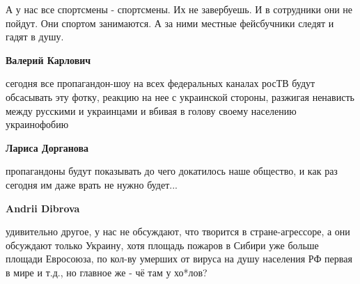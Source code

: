 \begin{itemize}
\begin{itemize}
 

А у нас все спортсмены - спортсмены. Их не завербуешь. И в сотрудники они не
пойдут. Они спортом занимаются. А за ними местные фейсбучники следят и гадят в
душу.


 
\textbf{Валерий Карлович} 

сегодня все пропагандон-шоу на всех федеральных каналах росТВ будут обсасывать
эту фотку, реакцию на нее с украинской стороны, разжигая ненависть между
русскими и украинцами и вбивая в голову своему населению украинофобию


 
\textbf{Лариса Дорганова} 

пропагандоны будут показывать до чего докатилось наше общество, и как раз
сегодня им даже врать не нужно будет...


 
\textbf{Andrii Dibrova} 

удивительно другое, у нас не обсуждают, что творится в
стране-агрессоре, а они обсуждают только Украину, хотя площадь пожаров в Сибири
уже больше площади Евросоюза, по кол-ву умерших от вируса на душу населения РФ
первая в мире и т.д., но главное же - чё там у хо*лов?
\end{itemize}

 


\end{itemize}
